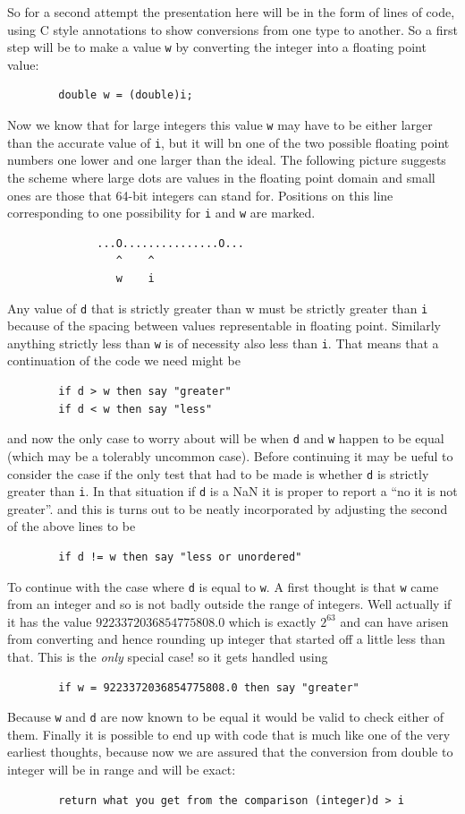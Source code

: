 So for a second attempt the presentation here will be in the form of lines
of code, using C style annotations to show conversions from one type
to another. So a first step will be to make a value \verb+w+ by converting
the integer into a floating point value:
\begin{verbatim}
        double w = (double)i;
\end{verbatim}
Now we know that for large integers this value \verb+w+ may have to be either
larger than the accurate value of \verb+i+, but it will bn one of the two
possible floating point numbers one lower and one larger than the ideal.
The following picture suggests the scheme where large dots are values
in the floating point domain and small ones are those that 64-bit integers
can stand for. Positions on this line corresponding to one possibility
for \verb+i+ and \verb+w+ are marked. 
\begin{verbatim}
              ...O...............O...
                 ^    ^
                 w    i
\end{verbatim}
Any value of \verb+d+ that is strictly greater than w must be strictly greater
than \verb+i+ because of the spacing between values representable in
floating point. Similarly anything strictly less than \verb+w+ is of
necessity also less than \verb+i+. That means that a continuation of the code
we need might be
\begin{verbatim}
        if d > w then say "greater"
        if d < w then say "less"
\end{verbatim}
and now the only case to worry about will be when \verb+d+ and \verb+w+
happen to be equal (which may be a tolerably uncommon case).
Before continuing it may be ueful to consider the case if the only test
that had to be made is whether \verb+d+ is strictly greater than \verb+i+.
In that situation if \verb+d+ is a NaN it is proper to report a ``no it
is not greater''. and this is turns out to be neatly incorporated by
adjusting the second of the above lines to be
\begin{verbatim}
        if d != w then say "less or unordered"
\end{verbatim}

To continue with the case where \verb+d+ is equal to \verb+w+. A first
thought is that \verb+w+ came from an integer and so is not badly outside the
range of integers. Well actually if it has the value $9223372036854775808.0$
which is exactly $2^{63}$ and can have arisen from converting and hence
rounding up integer that started off a little less than that. This is the
{\em only} special case! so it gets handled using 
\begin{verbatim}
        if w = 9223372036854775808.0 then say "greater"
\end{verbatim}
Because \verb+w+ and \verb+d+ are now known to be equal it would be
valid to check either of them. Finally it is possible to end up with
code that is much like one of the very earliest thoughts, because
now we are assured that the conversion from double to integer will be
in range and will be exact:
\begin{verbatim}
        return what you get from the comparison (integer)d > i
\end{verbatim}

